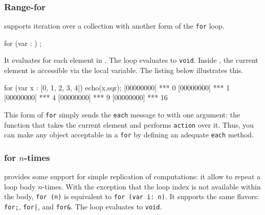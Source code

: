 \subsubsection{Range-for}
\label{sec:lang:for:each}

\us supports iteration over a collection with another form of the
\lstinline|for| loop.

\begin{urbiunchecked}
for (var  : )
   ;
\end{urbiunchecked}

It evaluates  for each element in . The loop
evaluates to \lstinline|void|.  Inside , the current element
is accessible via the  local variable. The listing below
illustrates this.

\begin{urbiscript}[firstnumber=last]
for (var x : [0, 1, 2, 3, 4])
  echo(x.sqr);
[00000000] *** 0
[00000000] *** 1
[00000000] *** 4
[00000000] *** 9
[00000000] *** 16
\end{urbiscript}

This form of \lstinline|for| simply sends the \lstinline|each| message
to  with one argument: the function that takes the
current element and performs \lstinline|action| over it. Thus, you can
make any object acceptable in a \lstinline|for| by defining an
adequate \lstinline|each| method.


\subsubsection{for $n$-times}
\label{sec:lang:for:n}

\us provides some support for simple replication of computations: it
allow to repeat a loop body $n$-times.  With the exception that the
loop index is not available within the body, \lstinline|for (n)| is
equivalent to \lstinline|for (var i: n)|.  It supports the same
flavors: \lstinline|for;|, \lstinline{for|}, and \lstinline|for&|. The
loop evaluates to \lstinline|void|.

